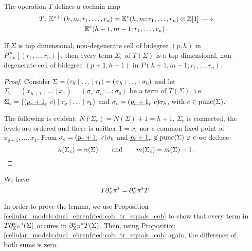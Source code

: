 \begin{prop}
    \label{homology_operations:parallel_T:T_is_a_cochain_map}
    The operation $T$ defines a cochain map
    \begin{multline*}
        T \colon \E^{\ast+1}(h,m; r_1, \ldots, r_n) = \E^\ast(h,m; r_1, \ldots, r_n) \otimes \Z[1] \to\\
        \E^\ast(h+1,m-1;r_1, \ldots, r_n) \,.
    \end{multline*}
\end{prop}

\begin{lem}
    \label{homology_operations:parallel_T:T_is_well_defined}
    If $\Sigma$ is top dimensional, non-degenerate cell of bidegree $(p,h)$ in $P_{g,n}^m[(r_1, \ldots, r_n)]$, then
    every term $\Sigma_c$ of $T(\Sigma)$ is a top dimensional, non-degenerate cell of bidegree $(p+1,h+1)$ in $P(h+1,m-1; r_1, \ldots, r_n)$.
\end{lem}

\begin{proof}
    Consider $\Sigma = \inhom = \homog$ and let $\Sigma_c = (x_{h+1} \mid \ldots \mid x_1) = ( \sigma_c : \sigma_h : \ldots : \sigma_0)$ be a term of $T(\Sigma)$, i.e.\ 
    $\Sigma_c = \big( (\ul{p_r+1}_r\ c)\mid \tau_q \mid \ldots \mid \tau_1 \big)$ and $\sigma_c = (\ul{p_r+1}_r\ c)\sigma_h$, with $c \in \punc(\Sigma)$.
    
    The following is evident:
    $N(\Sigma_c) = N(\Sigma) + 1 = h+1$, $\Sigma_c$ is connected, the levels are ordered and there is neither $1 = x_i$ nor a common fixed point of $x_{q+1}, \ldots, x_1$.
    From $\sigma_c = (\ul{p_r+1}_r\ c) \sigma_h$ and $\ul{p_r+1}_r \not\in \punc(\Sigma) \ni c$ we deduce
    \[
        n(\Sigma_c) = n(\Sigma) \mspc{and}{20} m(\Sigma_c) = m(\Sigma) - 1\,.
    \]
\end{proof}

\begin{lem}
    \label{homology_operations:parallel_T:T_commutes_with_del_pi}
    We have
    \[
        T\del_\KK^\ast\pi^\ast = \del_\KK^\ast\pi^\ast T \,.
    \]
\end{lem}

In order to prove the lemma, we use Proposition \ref{cellular_models:dual_ehrenfried:cob_tr_equals_cob} to show that every term in $T\del_\KK^\ast\pi^\ast(\Sigma)$ occures in $\del_\KK^\ast\pi^\ast T(\Sigma)$.
Then, using Proposition \ref{cellular_models:dual_ehrenfried:cob_tr_equals_cob} again, the difference of both sums is zero.

